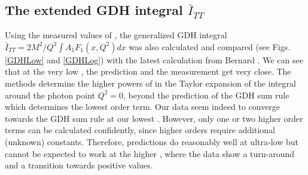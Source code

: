 \subsection{The extended GDH integral  $\bar{I}_{TT}$}
Using the %
measured values of \afone, the generalized GDH integral $\bar{I}_{TT}=2M^2/Q^2 \int A_1F_1(x,Q^2)dx$ was also calculated and compared (see Figs. \ref{GDHLow} and \ref{GDHLog}) with the %
latest \chipts calculation from Bernard \etal \cite{BEKM13}. %
We can see that at the very low \qsq, the \chipts prediction and the measurement get very close. 
The \chipts methods determine the higher powers of \qsqs in the Taylor expansion of the integral around the photon point $Q^2 = 0$, beyond the prediction of the GDH sum rule which determines the lowest order term. %
Our data seem indeed to converge towards the GDH sum rule at our lowest \qsq. %
However, only one or two higher order terms can be calculated confidently, since higher orders require additional (unknown) constants. Therefore, \chipts predictions do reasonably well at ultra-low \qsqs but cannot be expected to work at the higher \qsq, where the data show a turn-around and a %
transition towards positive values.


